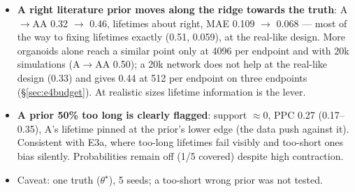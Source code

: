 \documentclass[10pt,a4paper]{article}
\newcommand{\blk}[1]{\par\needspace{5\baselineskip}\smallskip{\sffamily\bfseries\color{inkgray}#1}\par}
\newcommand{\Comment}{\blk{Comment}}
\begin{document}
\Comment
\begin{itemize}
\item \textbf{A right literature prior moves along the ridge towards the truth}: A$\to$AA 0.32 $\to$ 0.46, lifetimes about right, MAE 0.109 $\to$ 0.068 --- most of the way to fixing lifetimes exactly (0.51, 0.059), at the real-like design. More organoids alone reach a similar point only at 4096 per endpoint and with 20k simulations (A$\to$AA 0.50); a 20k network does not help at the real-like design (0.33) and gives 0.44 at 512 per endpoint on three endpoints (\S\ref{sec:e4budget}). At realistic sizes lifetime information is the lever.
\item \textbf{A prior 50\% too long is clearly flagged}: support $\approx 0$, PPC 0.27 (0.17--0.35), A's lifetime pinned at the prior's lower edge (the data push against it). Consistent with E3a, where too-long lifetimes fail visibly and too-short ones bias silently. Probabilities remain off (1/5 covered) despite high contraction.
\item Caveat: one truth ($\theta^\star$), 5 seeds; a too-short wrong prior was not tested.
\end{itemize}

\end{document}
